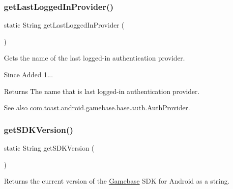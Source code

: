\subsubsection{\texorpdfstring{get\+Last\+Logged\+In\+Provider()}{getLastLoggedInProvider()}}
{\footnotesize\ttfamily static String get\+Last\+Logged\+In\+Provider (\begin{DoxyParamCaption}{ }\end{DoxyParamCaption})\hspace{0.3cm}{\ttfamily [static]}}



Gets the name of the last logged-\/in authentication provider. 

\begin{DoxySince}{Since}
Added 1... 
\end{DoxySince}
\begin{DoxyReturn}{Returns}
The name that is last logged-\/in authentication provider. 
\end{DoxyReturn}
\begin{DoxySeeAlso}{See also}
\hyperlink{interfacecom_1_1toast_1_1android_1_1gamebase_1_1base_1_1auth_1_1_auth_provider}{com.\+toast.\+android.\+gamebase.\+base.\+auth.\+Auth\+Provider}. 
\end{DoxySeeAlso}
\mbox{\label{classcom_1_1toast_1_1android_1_1gamebase_1_1_gamebase_aeb5168abbd62c631b65247e6289d1e2d}} 
\subsubsection{\texorpdfstring{get\+S\+D\+K\+Version()}{getSDKVersion()}}
{\footnotesize\ttfamily static String get\+S\+D\+K\+Version (\begin{DoxyParamCaption}{ }\end{DoxyParamCaption})\hspace{0.3cm}{\ttfamily [static]}}



Returns the current version of the \hyperlink{classcom_1_1toast_1_1android_1_1gamebase_1_1_gamebase}{Gamebase} S\+DK for Android as a string. 

